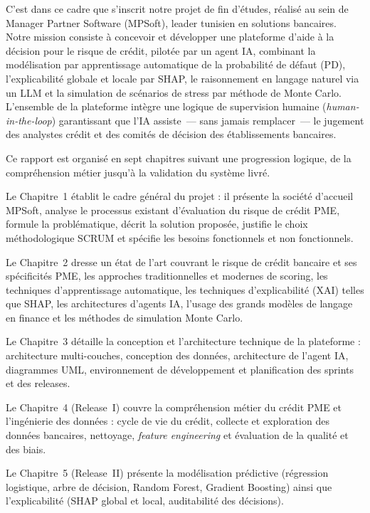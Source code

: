 \documentclass[a4paper,12pt,oneside]{report}
\begin{document}
C'est dans ce cadre que s'inscrit notre projet de fin d'études, réalisé au sein de
Manager Partner Software (MPSoft), leader tunisien en solutions bancaires. Notre mission
consiste à concevoir et développer une plateforme d'aide à la décision pour le risque de
crédit, pilotée par un agent IA, combinant la modélisation par apprentissage automatique de
la probabilité de défaut (PD), l'explicabilité globale et locale par SHAP, le raisonnement en
langage naturel via un LLM et la simulation de scénarios de stress par méthode de Monte Carlo.
L'ensemble de la plateforme intègre une logique de supervision humaine
(\textit{human-in-the-loop}) garantissant que l'IA assiste~--- sans jamais remplacer~--- le
jugement des analystes crédit et des comités de décision des établissements bancaires.

Ce rapport est organisé en sept chapitres suivant une progression logique, de la
compréhension métier jusqu'à la validation du système livré.

Le Chapitre~1 établit le cadre général du projet : il présente la société
d'accueil MPSoft, analyse le processus existant d'évaluation du risque
de crédit PME, formule la problématique, décrit la solution proposée, justifie le choix
méthodologique SCRUM et spécifie les besoins fonctionnels et non fonctionnels.

Le Chapitre~2 dresse un état de l'art couvrant le risque de crédit bancaire et
ses spécificités PME, les approches traditionnelles et modernes de scoring, les techniques
d'apprentissage automatique, les techniques d'explicabilité (XAI) telles que SHAP, les
architectures d'agents IA, l'usage des grands modèles de langage en finance et les méthodes
de simulation Monte Carlo.

Le Chapitre~3 détaille la conception et l'architecture technique de la plateforme :
architecture multi-couches, conception des données, architecture de l'agent IA, diagrammes
UML, environnement de développement et planification des sprints et des releases.

Le Chapitre~4 (Release~I) couvre la compréhension métier du crédit PME et
l'ingénierie des données : cycle de vie du crédit, collecte et exploration des données
bancaires, nettoyage, \textit{feature engineering} et évaluation de la qualité et des biais.

Le Chapitre~5 (Release~II) présente la modélisation prédictive (régression
logistique, arbre de décision, Random Forest, Gradient Boosting) ainsi que l'explicabilité
(SHAP global et local, auditabilité des décisions).
\end{document}
